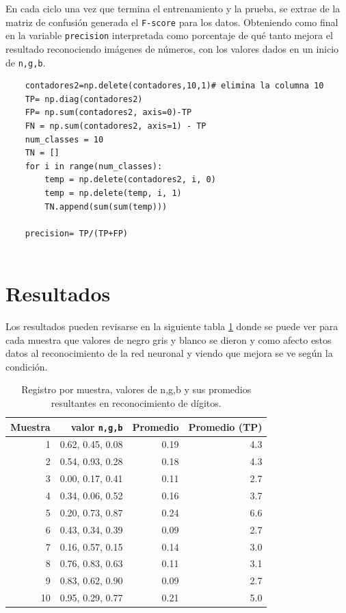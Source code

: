 \documentclass[a4paper, 11pt]{article}
\begin{document}
En cada ciclo una vez que termina el entrenamiento y la prueba, se extrae de la matriz de confusión generada el \texttt{F-score} para los datos.
Obteniendo como final en la variable \texttt{precision} interpretada como porcentaje de qué tanto mejora el resultado reconociendo imágenes de números, con los valores dados en un inicio de \texttt{n,g,b}.

\begin{verbatim}
    contadores2=np.delete(contadores,10,1)# elimina la columna 10
    TP= np.diag(contadores2)
    FP= np.sum(contadores2, axis=0)-TP
    FN = np.sum(contadores2, axis=1) - TP  
    num_classes = 10
    TN = []
    for i in range(num_classes):
        temp = np.delete(contadores2, i, 0)
        temp = np.delete(temp, i, 1)  
        TN.append(sum(sum(temp)))
    
    precision= TP/(TP+FP)    
    
\end{verbatim}


\section{Resultados}
Los resultados pueden revisarse en la siguiente tabla \ref{tab1} donde se puede ver para cada muestra que valores de negro gris y blanco se dieron y como afecto estos datos al reconocimiento de la red neuronal y viendo que mejora se ve según la condición.


\begin{table}[H]
        \caption{Registro por muestra, valores de n,g,b y sus promedios resultantes en reconocimiento de dígitos.}
        \bigskip
        \label{tab1}
        \centering
        \begin{tabular}{|r|r|r|r|}
        \hline
         Muestra&valor \texttt{n,g,b}&Promedio&Promedio (TP)  \\
        \hline
        1 & 0.62, 0.45, 0.08 & 0.19 & 4.3 \\
        \hline
        2 & 0.54, 0.93, 0.28 & 0.18 & 4.3 \\
        \hline
        3 & 0.00, 0.17, 0.41 & 0.11 & 2.7 \\
        \hline
        4 & 0.34, 0.06, 0.52 & 0.16 & 3.7 \\
        \hline
        5 & 0.20, 0.73, 0.87 & 0.24 & 6.6 \\
        \hline
        6 & 0.43, 0.34, 0.39 & 0.09 & 2.7 \\
        \hline
        7 & 0.16, 0.57, 0.15 & 0.14 & 3.0 \\
        \hline
        8 & 0.76, 0.83, 0.63 & 0.11 & 3.1 \\
        \hline
        9 & 0.83, 0.62, 0.90 & 0.09 & 2.7 \\
        \hline
        10 & 0.95, 0.29, 0.77 & 0.21 & 5.0 \\
        \hline
        
        \end{tabular}
    \end{table}
\end{document}
